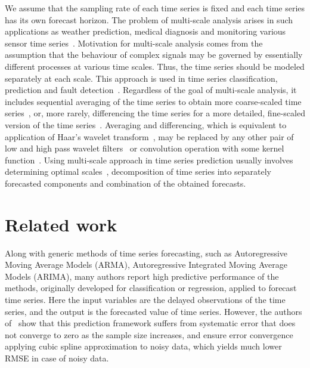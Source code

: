 \documentclass[conference]{IEEEtran}
\begin{document}
We assume that the sampling rate of each time series is fixed and each time series has its own forecast horizon. The problem of multi-scale analysis arises in such applications as weather prediction, medical diagnosis and monitoring various sensor time series~\cite{Costa2008, Ahmed2012, Cortez2012, Ferreira2006}. Motivation for multi-scale analysis comes from the assumption that the behaviour of complex signals may be governed by  essentially different processes at various time scales. Thus, the time series should be modeled separately at each scale. This approach is used in time series classification, prediction and fault detection~\cite{Cui2016, Cortez2012, Aldrich2013}. Regardless of the goal of multi-scale analysis, it includes sequential averaging of the time series to obtain more coarse-scaled time series~\cite{Wu2013}, or, more rarely, differencing the time series for a more detailed, fine-scaled version of the time series~\cite{Jiang2011}. Averaging and differencing, which is equivalent to application of Haar's wavelet transform~\cite{Jiang2011}, may be replaced by any other pair of low and high pass wavelet filters~\cite{Chen2004} or convolution operation with some kernel function~\cite{Vespier2012}. Using multi-scale approach in time series prediction usually involves determining optimal scales~\cite{Vespier2012, Ahmed2012}, decomposition of time series into separately forecasted components and combination of the obtained forecasts.


\section{Related work}
 Along with generic methods of time series forecasting, such as Autoregressive Moving Average Models (ARMA), Autoregressive Integrated Moving Average Models (ARIMA), many authors report high predictive performance of the methods, originally developed for classification or regression, applied to forecast time series. 
 Here the input variables are the delayed observations  of the time series, and the output is the forecasted value of time series. However, the authors of~\cite{Navarrete2015} show that this prediction framework suffers from systematic error that does not converge to zero as the sample size increases, and  ensure error convergence applying cubic spline approximation to noisy data, which yields much lower RMSE in case of noisy data. 
\end{document}
